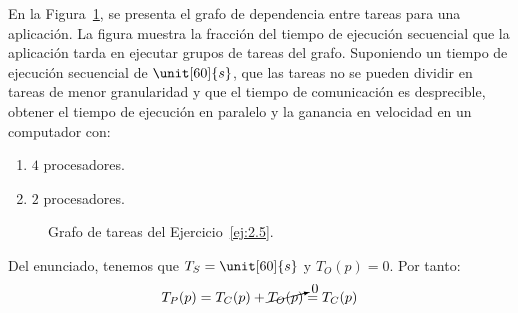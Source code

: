 \begin{ejercicio}\label{ej:2.5}
    
    En la Figura~\ref{fig:Grafo_2.5}, se presenta el grafo de dependencia entre tareas para una aplicación.
    La figura muestra la fracción del tiempo de ejecución secuencial que la aplicación tarda en ejecutar grupos de tareas del grafo.
    Suponiendo un tiempo de ejecución secuencial de $\unit[60]{s}$, que las tareas no se pueden dividir en tareas de menor granularidad y
    que el tiempo de comunicación es desprecible, obtener el tiempo de ejecución en paralelo y la ganancia en velocidad en un computador con:
    \begin{enumerate}
        \item $4$ procesadores.
        \item $2$ procesadores.
    \end{enumerate}
    \begin{figure}[H]
        \centering
        \caption{Grafo de tareas del Ejercicio~\ref{ej:2.5}.}
        \label{fig:Grafo_2.5}
    \end{figure}

    Del enunciado, tenemos que $T_S = \unit[60]{s}$ y $T_O(p) = 0$. Por tanto:
    \begin{equation*}
        T_P(p) = T_C(p) + \cancelto{0}{T_O(p)} = T_C(p)
    \end{equation*}
    

\end{ejercicio}
